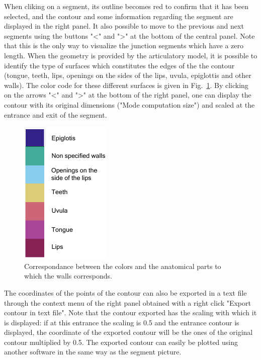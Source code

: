 \documentclass[]{article}
\begin{document}
	When cliking on a segment, its outline becomes red to confirm that
	it has been selected, and the contour and some information 
	regarding the segment are displayed in the right panel.
	It also possible to move to the previous and next segments using the buttons
	"<" and ">" at the bottom of the central panel.
	Note that this is the only way to visualize the junction segments which have 
	a zero length.
	When the geometry is provided by the articulatory model, it is 
	possible to identify the type of surfaces which constitutes the 
	edges of the the contour (tongue, teeth, lips, openings on the sides of the 
	lips, uvula, epiglottis and other walls).
	The color code for these different surfaces is given in 
	Fig.~\ref{figure:colormap_anatomical_parts}.
	By clicking on the arrows "<" and ">" at the bottom of the right  
	panel, one can display the contour with its original dimensions 
	("Mode computation size") and scaled at the entrance and exit of the
	segment.
	
	\begin{figure}[h!]
		\centering
		\includegraphics{colormap_anatomical_parts.pdf}
		\caption{Correspondance between the colors and the anatomical parts to which
		the walls corresponds.}
		\label{figure:colormap_anatomical_parts}
	\end{figure}
	
	The coordinates of the points of the contour can also be exported 
	in a text file through the context menu of the right panel obtained
	with a right click "Export contour in text file". 
	Note that the contour exported has the scaling with which it is 
	displayed: if at this entrance the scaling is 0.5 and the entrance 
	contour is displayed, the coordinate of the exported contour will
	be the ones of the original contour multiplied by 0.5.
	The exported contour can easily be plotted using another software in 
	the same way as the segment picture.
	
\end{document}

